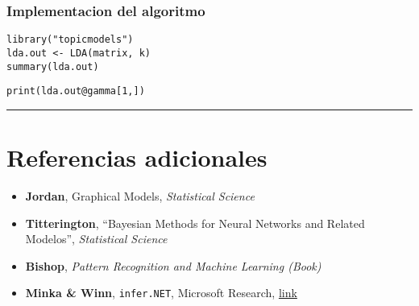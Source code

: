 \documentclass[11pt,]{article}
\newenvironment{Shaded}{\begin{snugshade}}{\end{snugshade}}
\newcommand{\KeywordTok}[1]{\textcolor[rgb]{0.13,0.29,0.53}{\textbf{#1}}}
\newcommand{\StringTok}[1]{\textcolor[rgb]{0.31,0.60,0.02}{#1}}
\newcommand{\OperatorTok}[1]{\textcolor[rgb]{0.81,0.36,0.00}{\textbf{#1}}}
\newcommand{\NormalTok}[1]{#1}
\begin{document}
\begin{Shaded}
\end{Shaded}

\subsubsection{Implementacion del
algoritmo}\label{implementacion-del-algoritmo}

\begin{verbatim}
library("topicmodels")
lda.out <- LDA(matrix, k)
summary(lda.out)
\end{verbatim}

\begin{verbatim}
print(lda.out@gamma[1,])
\end{verbatim}

\begin{center}\rule{0.5\linewidth}{\linethickness}\end{center}

\section{Referencias adicionales}\label{referencias-adicionales}

\begin{itemize}
\item
  \textbf{Jordan}, Graphical Models, \emph{Statistical Science}
\item
  \textbf{Titterington}, ``Bayesian Methods for Neural Networks and
  Related Modelos'', \emph{Statistical Science}
\item
  \textbf{Bishop}, \emph{Pattern Recognition and Machine Learning
  (Book)}
\item
  \textbf{Minka \& Winn}, \texttt{infer.NET}, Microsoft Research,
  \href{http://infernet.azurewebsites.net/}{link}
\end{itemize}




\newpage
\singlespacing 
\end{document}
